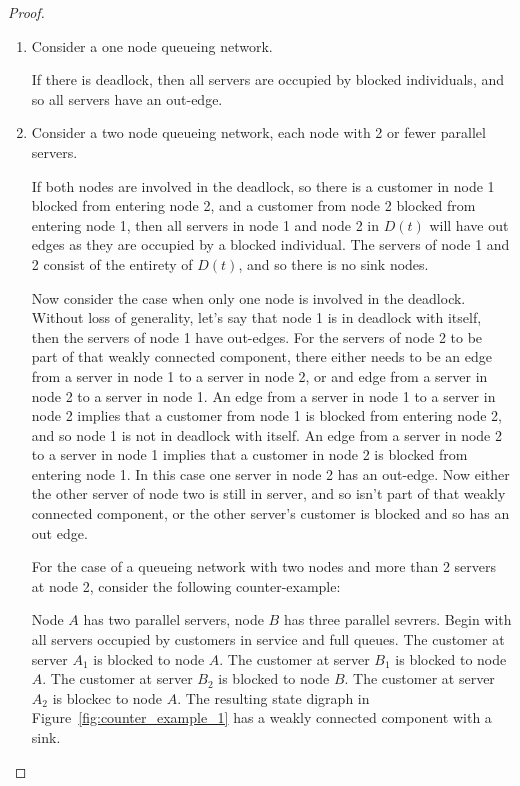 \documentclass{article}
\begin{document}
\begin{proof}

\begin{enumerate}

\item Consider a one node queueing network.

If there is deadlock, then all servers are occupied by blocked individuals, and so all servers have an out-edge.

\item Consider a two node queueing network, each node with 2 or fewer parallel servers.

If both nodes are involved in the deadlock, so there is a customer in node 1 blocked from entering node 2, and a customer from node 2 blocked from entering node 1, then all servers in node 1 and node 2 in $D(t)$ will have out edges as they are occupied by a blocked individual.
The servers of node 1 and 2 consist of the entirety of $D(t)$, and so there is no sink nodes.

Now consider the case when only one node is involved in the deadlock.
Without loss of generality, let's say that node 1 is in deadlock with itself, then the servers of node 1 have out-edges.
For the servers of node 2 to be part of that weakly connected component, there either needs to be an edge from a server in node 1 to a server in node 2, or and edge from a server in node 2 to a server in node 1.
An edge from a server in node 1 to a server in node 2 implies that a customer from node 1 is blocked from entering node 2, and so node 1 is not in deadlock with itself.
An edge from a server in node 2 to a server in node 1 implies that a customer in node 2 is blocked from entering node 1.
In this case one server in node 2 has an out-edge.
Now either the other server of node two is still in server, and so isn't part of that weakly connected component, or the other server's customer is blocked and so has an out edge.

For the case of a queueing network with two nodes and more than 2 servers at node 2, consider the following counter-example:

Node $A$ has two parallel servers, node $B$ has three parallel sevrers.
Begin with all servers occupied by customers in service and full queues.
The customer at server $A_1$ is blocked to node $A$.
The customer at server $B_1$ is blocked to node $A$.
The customer at server $B_2$ is blocked to node $B$.
The customer at server $A_2$ is blockec to node $A$.
The resulting state digraph in Figure~\ref{fig:counter_example_1} has a weakly connected component with a sink.


\end{enumerate}
\end{proof}
\end{document}

